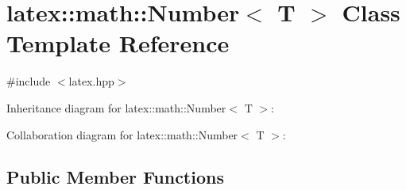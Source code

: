 \hypertarget{classlatex_1_1math_1_1Number}{\section{latex\-:\-:math\-:\-:\-Number$<$ \-T $>$ \-Class \-Template \-Reference}
\label{classlatex_1_1math_1_1Number}
}


{\ttfamily \#include $<$latex.\-hpp$>$}



\-Inheritance diagram for latex\-:\-:math\-:\-:\-Number$<$ \-T $>$\-:


\-Collaboration diagram for latex\-:\-:math\-:\-:\-Number$<$ \-T $>$\-:
\subsection*{\-Public \-Member \-Functions}
